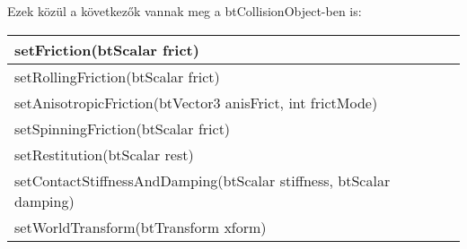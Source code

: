 \documentclass[12p,a4paper,notitlepage]{scrartcl}
\begin{document}
\bigskip

Ezek közül a következők vannak meg a btCollisionObject-ben is:

\smallskip

\renewcommand{\arraystretch}{1.5}

\begin{tabular}{|l|}
\hline
setFriction(btScalar frict) \\
\hline
setRollingFriction(btScalar frict) \\
\hline
setAnisotropicFriction(btVector3 anisFrict, int frictMode) \\
\hline
setSpinningFriction(btScalar frict) \\
\hline
setRestitution(btScalar rest) \\
\hline
setContactStiffnessAndDamping(btScalar stiffness, btScalar damping) \\
\hline
setWorldTransform(btTransform xform) \\
\hline
\end{tabular}
\end{document}
